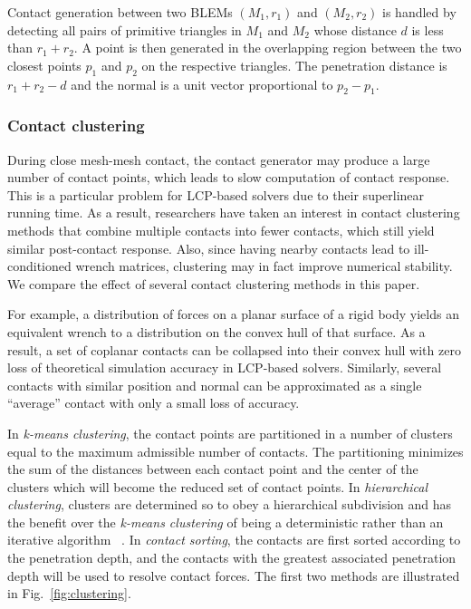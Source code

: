 Contact generation between two BLEMs $(M_1,r_1)$ and $(M_2,r_2)$ is handled by detecting all pairs of primitive triangles in $M_1$ and $M_2$ whose distance $d$ is less than $r_1+r_2$.  A point is then generated in the overlapping region between the two closest points $p_1$ and $p_2$ on the respective triangles.  The penetration distance is $r_1+r_2-d$ and the normal is a unit vector proportional to $p_2-p_1$.


\subsubsection{Contact clustering}

During close mesh-mesh contact, the contact generator may produce a large number of contact points, which leads to slow computation of contact response. This is a particular problem for LCP-based solvers due to their superlinear running time.  As a result, researchers have taken an interest in contact clustering methods that combine multiple contacts into fewer contacts, which still yield similar post-contact response.  Also, since having nearby contacts lead to ill-conditioned wrench matrices, clustering may in fact improve numerical stability.  We compare the effect of several contact clustering methods in this paper.

For example, a distribution of forces on a planar surface of a rigid body yields an equivalent wrench to a distribution on the convex hull of that surface. As a result, a set of coplanar contacts can be collapsed into their convex hull with zero loss of theoretical simulation accuracy in LCP-based solvers.  Similarly, several contacts with similar position and normal can be approximated as a single ``average'' contact with only a small loss of accuracy.

In \emph{k-means clustering}, the contact points are partitioned in a number of clusters equal to the maximum admissible number of contacts. The partitioning minimizes the sum of the distances between each contact point and the center of the clusters which will become the reduced set of contact points.
In \emph{hierarchical clustering}, clusters are determined so to obey a hierarchical subdivision and has the benefit over the \emph{k-means clustering} of being a deterministic rather than an iterative algorithm ~\cite{Rokach10}.
In \emph{contact sorting}, the contacts are first sorted according to the penetration depth, and the contacts with the greatest associated penetration depth will be used to resolve contact forces. The first two methods are illustrated in Fig.~\ref{fig:clustering}.


